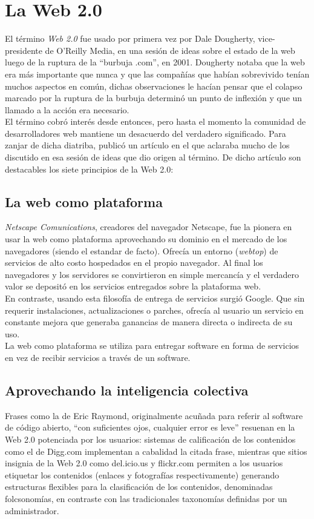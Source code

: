 \section{La Web 2.0}
El término \emph{Web 2.0} fue usado por primera vez por Dale Dougherty, vice-presidente de O'Reilly Media, en una sesión de ideas sobre el estado de la web luego de la ruptura de la ``burbuja .com'', en 2001. Dougherty notaba que la web era más importante que nunca y que las compañías que habían sobrevivido tenían muchos aspectos en común, dichas observaciones le hacían pensar que el colapso marcado por la ruptura de la burbuja determinó un punto de inflexión y que un llamado a la acción era necesario.\\

El término cobró interés desde entonces, pero hasta el momento la comunidad de desarrolladores web mantiene un desacuerdo del verdadero significado. Para zanjar de dicha diatriba, \citeauthor{Web_OReilly20052} publicó un artículo en el que aclaraba mucho de los discutido en esa sesión de ideas que dio origen al término. De dicho artículo son destacables los siete principios de la Web 2.0:

\subsection{La web como plataforma} 
\emph{Netscape Comunications}, creadores del navegador Netscape, fue la pionera en usar la web como plataforma aprovechando su dominio en el mercado de los navegadores (siendo el estandar de facto). Ofrecía un entorno (\emph{webtop}) de servicios de alto costo hospedados en el propio navegador. Al final los navegadores y los servidores se convirtieron en simple mercancía y el verdadero valor se depositó en los servicios entregados sobre la plataforma web.\\

En contraste, usando esta filosofía de entrega de servicios surgió Google. Que sin requerir instalaciones, actualizaciones o parches, ofrecía al usuario un servicio en constante mejora que generaba ganancias de manera directa o indirecta de su uso.\\

La web como plataforma se utiliza para entregar software en forma de servicios en vez de recibir servicios a través de un software.

\subsection{Aprovechando la inteligencia colectiva}
Frases como la de Eric Raymond, originalmente acuñada para referir al software de código abierto, ``con suficientes ojos, cualquier error es leve'' \citep{Neff2002} resuenan en la Web 2.0 potenciada por los usuarios: sistemas de calificación de los contenidos como el de Digg.com implementan a cabalidad la citada frase, mientras que sitios insignia de la Web 2.0 como del.icio.us y flickr.com permiten a los usuarios etiquetar los contenidos (enlaces y fotografías respectivamente) generando estructuras flexibles para la clasificación de los contenidos, denominadas folcsonomías, en contraste con las tradicionales taxonomías definidas por un administrador.

